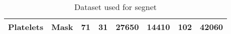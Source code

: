 \begin{table}[H]
{\begin{tabular}{|cc|c|c|c|c|c|c|}
\multicolumn{1}{|c|}{\multirow{-2}{*}{{\color[HTML]{000000} \textbf{Platelets}}}}         & {\color[HTML]{000000} \textbf{Mask}}  & {\color[HTML]{000000} 71}                                                              & {\color[HTML]{000000} 31}                                                             & {\color[HTML]{000000} 27650}                                                          & {\color[HTML]{000000} 14410}                                                         & {\color[HTML]{000000} 102}                                                             & {\color[HTML]{000000} \textbf{42060}}                                                 \\ \hline
\end{tabular}%
}
\caption{Dataset used for segnet}
\label{Dataset used for segnet}
\end{table}

